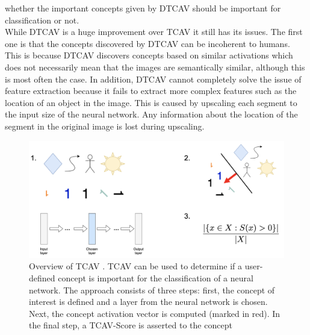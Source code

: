 \documentclass{article}
\begin{document}
whether the important concepts given by DTCAV should be important for classification or not. \\
While DTCAV is a huge improvement over TCAV it still has its issues. The first one is that the concepts discovered by DTCAV can be incoherent to humans.
This is because DTCAV discovers concepts based on similar activations which does not necessarily mean that the images are semantically similar, although this
is most often the case. In addition, DTCAV cannot completely solve the issue of feature extraction because it fails to extract more complex features such as the
location of an object in the image. This is caused by upscaling each segment to the input size of the neural network. Any information about the location of the
segment in the original image is lost during upscaling.


\begin{figure}
    \centering
    \includegraphics[scale=0.45]{tcav.png}
    \caption{Overview of TCAV \cite{pmlr-v80-kim18d}. TCAV can be used to determine if a user-defined
    concept is important for the classification of a neural network. The approach consists of three steps: first,
    the concept of interest is defined and a layer from the neural network is chosen. Next, the concept activation
    vector is computed (marked in red). In the final step, a TCAV-Score is asserted to the concept}
    \label{fig:tcav}
\end{figure}
\end{document}
